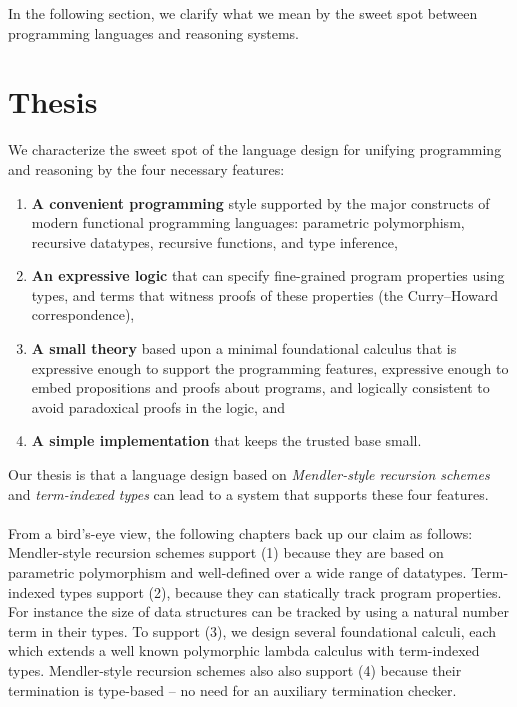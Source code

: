 In the following section, we clarify what we mean by the sweet spot between
programming languages and reasoning systems.

\section{Thesis}\label{sec:intro:thesis}
We characterize the sweet spot of the language design for unifying
programming and reasoning by the four necessary features:
\begin{enumerate}[(1)]
 \item \textbf{A convenient programming} style
         supported by the major constructs of
         modern functional programming languages: 
         parametric polymorphism, recursive datatypes,
         recursive functions, and type inference,

 \item \textbf{An expressive logic} that can specify
	 fine-grained program properties using types,
	 and terms that witness proofs of these properties 
         (the Curry--Howard correspondence),

 \item \textbf{A small theory} based upon a minimal foundational calculus
	 that is expressive enough to support the programming features,
	 expressive enough to embed propositions and proofs about programs,
	 and logically consistent to avoid paradoxical proofs in the logic, and

 \item \textbf{A simple implementation} that keeps the trusted base small.
\end{enumerate}
Our thesis is
that a language design based on \emph{Mendler-style recursion schemes}
and \emph{term-indexed types} can lead to a system that supports these four
features.

\paragraph{}
From a bird's-eye view, the following chapters back up our claim as follows:
Mendler-style recursion schemes support (1) because they are based on
parametric polymorphism and well-defined over a wide range of datatypes.
Term-indexed types support (2), because they can statically track
program properties. For instance the size of data structures can be tracked
by using a natural number term in their types.
To support (3), we design several foundational calculi, each which extends
a well known polymorphic lambda calculus with term-indexed types.
Mendler-style recursion schemes also also support (4) because their
termination is type-based -- no need for an auxiliary termination checker.

